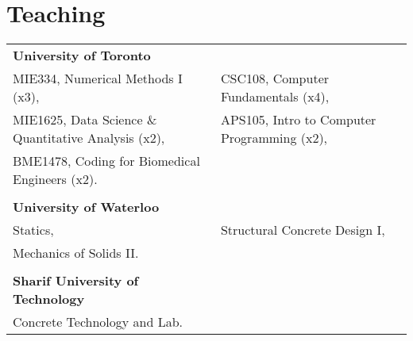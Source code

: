 \documentclass[a4paper,11pt]{article}
\begin{document}
\section{Teaching}
\begin{tabularx}{\linewidth}{@{}l X@{}}
\textbf{University of Toronto} \\
MIE334, Numerical Methods I (x3), &
CSC108, Computer Fundamentals (x4), \\ 
MIE1625, Data Science \& Quantitative Analysis (x2), &  
APS105, Intro to Computer Programming (x2), \\
BME1478, Coding for Biomedical Engineers (x2).\\
\\
\textbf{University of Waterloo} \\
Statics, &
Structural Concrete Design I, \\
Mechanics of Solids II. \\
\\

\textbf{Sharif University of Technology} \\
 Concrete Technology and Lab.\\
\end{tabularx}




\vfill
{}
\end{document}
